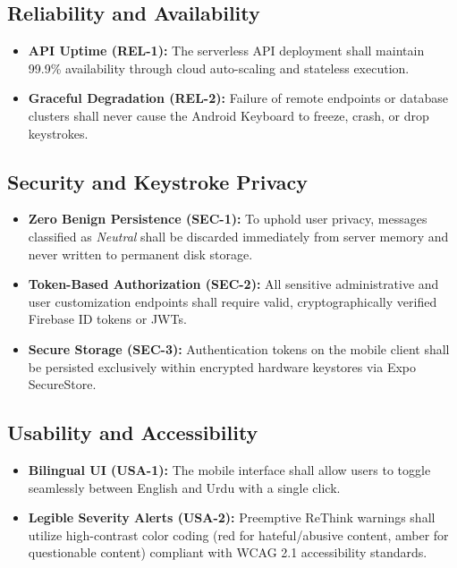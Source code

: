 \documentclass[A4paper,12pt]{report}
\theoremstyle{plain}
\theoremstyle{definition}
\theoremstyle{remark}
\numberwithin{equation}{section}
\begin{document}
\subsection{Reliability and Availability}
\begin{itemize}[leftmargin=*]
    \item \textbf{API Uptime (REL-1):} The serverless API deployment shall maintain 99.9\% availability through cloud auto-scaling and stateless execution.
    \item \textbf{Graceful Degradation (REL-2):} Failure of remote endpoints or database clusters shall never cause the Android Keyboard to freeze, crash, or drop keystrokes.
\end{itemize}

\subsection{Security and Keystroke Privacy}
\begin{itemize}[leftmargin=*]
    \item \textbf{Zero Benign Persistence (SEC-1):} To uphold user privacy, messages classified as \textit{Neutral} shall be discarded immediately from server memory and never written to permanent disk storage.
    \item \textbf{Token-Based Authorization (SEC-2):} All sensitive administrative and user customization endpoints shall require valid, cryptographically verified Firebase ID tokens or JWTs.
    \item \textbf{Secure Storage (SEC-3):} Authentication tokens on the mobile client shall be persisted exclusively within encrypted hardware keystores via Expo SecureStore.
\end{itemize}

\subsection{Usability and Accessibility}
\begin{itemize}[leftmargin=*]
    \item \textbf{Bilingual UI (USA-1):} The mobile interface shall allow users to toggle seamlessly between English and Urdu with a single click.
    \item \textbf{Legible Severity Alerts (USA-2):} Preemptive ReThink warnings shall utilize high-contrast color coding (red for hateful/abusive content, amber for questionable content) compliant with WCAG 2.1 accessibility standards.
\end{itemize}
\end{document}
